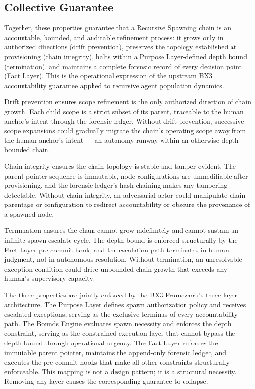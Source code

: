 \subsection{Collective Guarantee}
\label{sec:rs-collective-guarantee}

Together, these properties guarantee that a Recursive Spawning chain is an accountable, bounded, and auditable refinement process: it grows only in authorized directions (drift prevention), preserves the topology established at provisioning (chain integrity), halts within a Purpose Layer-defined depth bound (termination), and maintains a complete forensic record of every decision point (Fact Layer). This is the operational expression of the upstream BX3 accountability guarantee applied to recursive agent population dynamics.

Drift prevention ensures scope refinement is the only authorized direction of chain growth. Each child scope is a strict subset of its parent, traceable to the human anchor's intent through the forensic ledger. Without drift prevention, successive scope expansions could gradually migrate the chain's operating scope away from the human anchor's intent — an autonomy runway within an otherwise depth-bounded chain.

Chain integrity ensures the chain topology is stable and tamper-evident. The parent pointer sequence is immutable, node configurations are unmodifiable after provisioning, and the forensic ledger's hash-chaining makes any tampering detectable. Without chain integrity, an adversarial actor could manipulate chain parentage or configuration to redirect accountability or obscure the provenance of a spawned node.

Termination ensures the chain cannot grow indefinitely and cannot sustain an infinite spawn-escalate cycle. The depth bound is enforced structurally by the Fact Layer pre-commit hook, and the escalation path terminates in human judgment, not in autonomous resolution. Without termination, an unresolvable exception condition could drive unbounded chain growth that exceeds any human's supervisory capacity.

The three properties are jointly enforced by the BX3 Framework's three-layer architecture. The Purpose Layer defines spawn authorization policy and receives escalated exceptions, serving as the exclusive terminus of every accountability path. The Bounds Engine evaluates spawn necessity and enforces the depth constraint, serving as the constrained execution layer that cannot bypass the depth bound through operational urgency. The Fact Layer enforces the immutable parent pointer, maintains the append-only forensic ledger, and executes the pre-commit hooks that make all other constraints structurally enforceable. This mapping is not a design pattern; it is a structural necessity. Removing any layer causes the corresponding guarantee to collapse.
